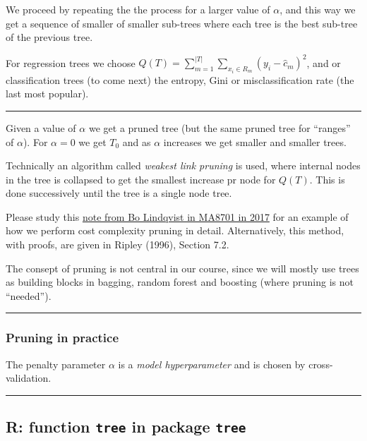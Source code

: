 \documentclass[
  letterpaper,
  DIV=11,
  numbers=noendperiod]{scrartcl}
\begin{document}
We proceed by repeating the the process for a larger value of
\(\alpha\), and this way we get a sequence of smaller of smaller
sub-trees where each tree is the best sub-tree of the previous tree.

For regression trees we choose
\(Q(T)=\sum_{m=1}^{|T|}\sum_{x_i\in R_m}(y_i - \hat{c}_m)^2\), and or
classification trees (to come next) the entropy, Gini or
misclassification rate (the last most popular).

\begin{center}\rule{0.5\linewidth}{0.5pt}\end{center}

Given a value of \(\alpha\) we get a pruned tree (but the same pruned
tree for ``ranges'' of \(\alpha\)). For \(\alpha=0\) we get \(T_0\) and
as \(\alpha\) increases we get smaller and smaller trees.

Technically an algorithm called \emph{weakest link pruning} is used,
where internal nodes in the tree is collapsed to get the smallest
increase pr node for \(Q(T)\). This is done successively until the tree
is a single node tree.

Please study this
\href{https://www.math.ntnu.no/emner/TMA4268/2018v/notes/CART1MA87012017BoLindqvist.pdf}{note
from Bo Lindqvist in MA8701 in 2017} for an example of how we perform
cost complexity pruning in detail. Alternatively, this method, with
proofs, are given in Ripley (1996), Section 7.2.

The consept of pruning is not central in our course, since we will
mostly use trees as building blocks in bagging, random forest and
boosting (where pruning is not ``needed'').

\begin{center}\rule{0.5\linewidth}{0.5pt}\end{center}

\hypertarget{pruning-in-practice}{%
\subsubsection{Pruning in practice}\label{pruning-in-practice}}

The penalty parameter \(\alpha\) is a \emph{model hyperparameter} and is
chosen by cross-validation.

\begin{center}\rule{0.5\linewidth}{0.5pt}\end{center}

\hypertarget{r-function-tree-in-package-tree}{%
\subsection{\texorpdfstring{R: function \texttt{tree} in package
\texttt{tree}}{R: function tree in package tree}}\label{r-function-tree-in-package-tree}}
\end{document}
